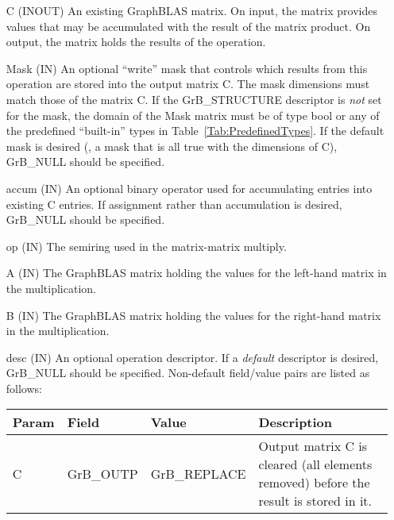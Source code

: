 \begin{itemize}[leftmargin=1.1in]
    \item[{\sf C}]    ({\sf INOUT}) An existing GraphBLAS matrix. On input,
    the matrix provides values that may be accumulated with the result of the
    matrix product.  On output, the matrix holds the results of the
    operation.

    \item[{\sf Mask}] ({\sf IN}) An optional ``write'' mask that controls which
    results from this operation are stored into the output matrix {\sf C}. The 
    mask dimensions must match those of the matrix {\sf C}. If the 
    {\sf GrB\_STRUCTURE} descriptor is {\em not} set for the mask, the domain 
    of the {\sf Mask} matrix must be of type {\sf bool} or any of the predefined 
    ``built-in'' types in Table~\ref{Tab:PredefinedTypes}.  If the default
    mask is desired (\ie, a mask that is all {\sf true} with the dimensions of {\sf C}), 
    {\sf GrB\_NULL} should be specified. 

    \item[{\sf accum}] ({\sf IN}) An optional binary operator used for accumulating
    entries into existing {\sf C} entries.
    If assignment rather than accumulation is
    desired, {\sf GrB\_NULL} should be specified.

    \item[{\sf op}]   ({\sf IN}) The semiring used in the matrix-matrix
    multiply.

    \item[{\sf A}]    ({\sf IN}) The GraphBLAS matrix holding the values
    for the left-hand matrix in the multiplication.

    \item[{\sf B}]    ({\sf IN}) The GraphBLAS matrix holding the values for
    the right-hand matrix in the multiplication.

    \item[{\sf desc}] ({\sf IN}) An optional operation descriptor. If
    a \emph{default} descriptor is desired, {\sf GrB\_NULL} should be
    specified. Non-default field/value pairs are listed as follows:  \\
    
    \hspace*{-2em}\begin{tabular}{lllp{2.7in}}
        Param & Field  & Value & Description \\
        \hline
        {\sf C}    & {\sf GrB\_OUTP} & {\sf GrB\_REPLACE} & Output matrix {\sf C}
        is cleared (all elements removed) before the result is stored in it.\\


\end{tabular}
\end{itemize}
